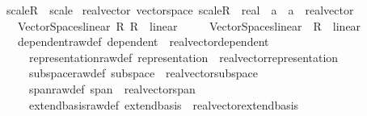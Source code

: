 \begin{isabellebody}
\isanewline
\isanewline
{}\isamarkupfalse%
\ scaleR\ {\isacharequal}{\kern0pt}\ scale\isanewline
\isanewline
{}\isamarkupfalse%
\isanewline
\isanewline
{}\isamarkupfalse%
\ real{\isacharunderscore}{\kern0pt}vector{\isacharquery}{\kern0pt}{\isacharcolon}{\kern0pt}\ vector{\isacharunderscore}{\kern0pt}space\ {\isachardoublequoteopen}scaleR\ {\isacharcolon}{\kern0pt}{\isacharcolon}{\kern0pt}\ real\ {\isasymRightarrow}\ {\isacharprime}{\kern0pt}a\ {\isasymRightarrow}\ {\isacharprime}{\kern0pt}a\ {\isacharcolon}{\kern0pt}{\isacharcolon}{\kern0pt}\ real{\isacharunderscore}{\kern0pt}vector{\isachardoublequoteclose}\isanewline
\ \ \ {\isachardoublequoteopen}Vector{\isacharunderscore}{\kern0pt}Spaces{\isachardot}{\kern0pt}linear\ {\isacharparenleft}{\kern0pt}{\isacharasterisk}{\kern0pt}\isactrlsub R{\isacharparenright}{\kern0pt}\ {\isacharparenleft}{\kern0pt}{\isacharasterisk}{\kern0pt}\isactrlsub R{\isacharparenright}{\kern0pt}\ {\isacharequal}{\kern0pt}\ linear{\isachardoublequoteclose}\isanewline
\ \ \ \ \ {\isachardoublequoteopen}Vector{\isacharunderscore}{\kern0pt}Spaces{\isachardot}{\kern0pt}linear\ {\isacharparenleft}{\kern0pt}{\isacharasterisk}{\kern0pt}{\isacharparenright}{\kern0pt}\ {\isacharparenleft}{\kern0pt}{\isacharasterisk}{\kern0pt}\isactrlsub R{\isacharparenright}{\kern0pt}\ {\isacharequal}{\kern0pt}\ linear{\isachardoublequoteclose}\isanewline
\ \ \ dependent{\isacharunderscore}{\kern0pt}raw{\isacharunderscore}{\kern0pt}def{\isacharcolon}{\kern0pt}\ dependent\ {\isacharequal}{\kern0pt}\ real{\isacharunderscore}{\kern0pt}vector{\isachardot}{\kern0pt}dependent\isanewline
\ \ \ \ \ representation{\isacharunderscore}{\kern0pt}raw{\isacharunderscore}{\kern0pt}def{\isacharcolon}{\kern0pt}\ representation\ {\isacharequal}{\kern0pt}\ real{\isacharunderscore}{\kern0pt}vector{\isachardot}{\kern0pt}representation\isanewline
\ \ \ \ \ subspace{\isacharunderscore}{\kern0pt}raw{\isacharunderscore}{\kern0pt}def{\isacharcolon}{\kern0pt}\ subspace\ {\isacharequal}{\kern0pt}\ real{\isacharunderscore}{\kern0pt}vector{\isachardot}{\kern0pt}subspace\isanewline
\ \ \ \ \ span{\isacharunderscore}{\kern0pt}raw{\isacharunderscore}{\kern0pt}def{\isacharcolon}{\kern0pt}\ span\ {\isacharequal}{\kern0pt}\ real{\isacharunderscore}{\kern0pt}vector{\isachardot}{\kern0pt}span\isanewline
\ \ \ \ \ extend{\isacharunderscore}{\kern0pt}basis{\isacharunderscore}{\kern0pt}raw{\isacharunderscore}{\kern0pt}def{\isacharcolon}{\kern0pt}\ extend{\isacharunderscore}{\kern0pt}basis\ {\isacharequal}{\kern0pt}\ real{\isacharunderscore}{\kern0pt}vector{\isachardot}{\kern0pt}extend{\isacharunderscore}{\kern0pt}basis\isanewline

\end{isabellebody}

